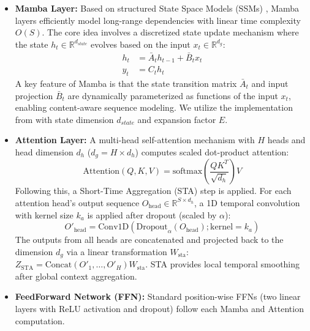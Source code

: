 \documentclass[runningheads]{llncs}
\begin{document}
\begin{itemize}
    \item \textbf{Mamba Layer:} Based on structured State Space Models (SSMs) \cite{cite_mamba}, Mamba layers efficiently model long-range dependencies with linear time complexity $O(S)$. The core idea involves a discretized state update mechanism where the state $h_t \in \mathbb{R}^{d_{state}}$ evolves based on the input $x_t \in \mathbb{R}^{d_g}$:
        \begin{equation}
            \begin{split}
                h_t &= \bar{A}_t h_{t-1} + \bar{B}_t x_t \\
                y_t &= C_t h_t
            \end{split}
            \label{eq:mamba_ssm}
        \end{equation}
        A key feature of Mamba is that the state transition matrix $\bar{A}_t$ and input projection $\bar{B}_t$ are dynamically parameterized as functions of the input $x_t$, enabling content-aware sequence modeling. We utilize the implementation from \cite{cite_mamba_code} with state dimension $d_{state}$ and expansion factor $E$.
        \\
    \item \textbf{Attention Layer:} A multi-head self-attention mechanism with $H$ heads and head dimension $d_h$ ($d_g = H \times d_h$) computes scaled dot-product attention:
        \begin{equation}
            \text{Attention}(Q, K, V) = \text{softmax}\left(\frac{QK^T}{\sqrt{d_h}}\right)V
            \label{eq:attention}
        \end{equation}
        Following this, a Short-Time Aggregation (STA) step is applied. For each attention head's output sequence $O_{\text{head}} \in \mathbb{R}^{S \times d_h}$, a 1D temporal convolution with kernel size $k_a$ is applied after dropout (scaled by $\alpha$):
        \begin{equation}
            O'_{\text{head}} = \text{Conv1D}(\text{Dropout}_{\alpha}(O_{\text{head}}); \text{kernel}=k_a)
            \label{eq:sta_conv}
        \end{equation}
        The outputs from all heads are concatenated and projected back to the dimension $d_g$ via a linear transformation $W_{\text{sta}}$: $Z_{\text{STA}} = \text{Concat}(O'_{1}, \dots, O'_{H}) W_{\text{sta}}$. STA provides local temporal smoothing after global context aggregation.
        \\
    \item \textbf{FeedForward Network (FFN):} Standard position-wise FFNs (two linear layers with ReLU activation and dropout) follow each Mamba and Attention computation.
\end{itemize}
\end{document}
